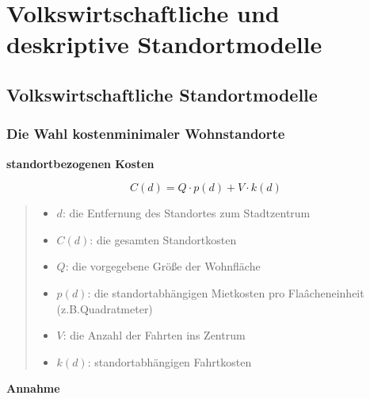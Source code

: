 \chapter{Volkswirtschaftliche und deskriptive Standortmodelle} %
\label{cha:volkswirtschaftliche_und_deskriptive_standortmodelle}

  \section{Volkswirtschaftliche Standortmodelle} %
  \label{sec:volkswirtschaftliche_standortmodelle}

    \subsection{Die Wahl kostenminimaler Wohnstandorte} %
    \label{sub:die_Wahl_kostenminimaler_Wohnstandorte}
    
      \par \textbf{standortbezogenen Kosten}

      \begin{equation}
        C(d) = Q\cdot p(d) + V\cdot k(d)
        \label{standortbezogenen Kosten}
      \end{equation}

      \begin{quote}
        \begin{itemize}
        \setlength{\itemsep}{1pt}
        \setlength{\parskip}{0pt}
        \setlength{\parsep}{0pt}
          \item $d$: die Entfernung des Standortes zum Stadtzentrum
          \item $C(d)$: die gesamten Standortkosten
          \item $Q$: die vorgegebene Größe der Wohnfläche
          \item $p(d)$: die standortabhängigen Mietkosten pro Flaâcheneinheit (z.B.Quadratmeter)
          \item $V$: die Anzahl der Fahrten ins Zentrum
          \item $k(d)$: standortabhängigen Fahrtkosten
        \end{itemize}
      \end{quote}

      \par \textbf{Annahme}

